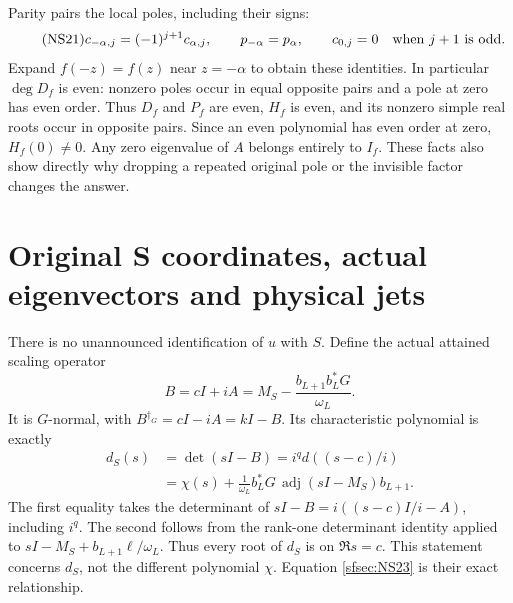 Parity pairs the local poles, including their signs:
\begin{equation}\tag{NS21}\label{sfsec:NS21}
c_{-\alpha,j}=(-1)^{j+1}c_{\alpha,j},\qquad
p_{-\alpha}=p_\alpha,\qquad
c_{0,j}=0\quad\hbox{when }j+1\hbox{ is odd}.
\end{equation}
Expand $f(-z)=f(z)$ near $z=-\alpha$ to obtain these
identities. In particular $\deg D_f$ is even: nonzero
poles occur in equal opposite pairs and a pole at zero
has even order. Thus $D_f$ and $P_f$ are even, $H_f$
is even, and its nonzero simple real roots occur in
opposite pairs. Since an even polynomial has even
order at zero, $H_f(0)\ne0$. Any zero eigenvalue of
$A$ belongs entirely to $I_f$. These facts also show
directly why dropping a repeated original pole or the
invisible factor changes the answer.

\section{Original S coordinates, actual eigenvectors and physical jets}

There is no unannounced identification of $u$ with $S$.
Define the actual attained scaling operator
\begin{equation}\tag{NS22}\label{sfsec:NS22}
B=cI+iA=M_S-\frac{b_{L+1}b_L^*G}{\omega_L}.
\end{equation}
It is $G$-normal, with $B^{\dagger_G}=cI-iA=kI-B$.
Its characteristic polynomial is exactly
\begin{equation}\tag{NS23}\label{sfsec:NS23}
\begin{split}
d_S(s)&=\det(sI-B)=i^qd((s-c)/i)\\
 &=\chi(s)
  +\frac1{\omega_L}b_L^*G\,
               \operatorname{adj}(sI-M_S)b_{L+1}.
\end{split}
\end{equation}
The first equality takes the determinant of
$sI-B=i((s-c)I/i-A)$, including $i^q$.
The second follows from the rank-one determinant identity
applied to $sI-M_S+b_{L+1}\ell/\omega_L$.
Thus every root of $d_S$ is on $\Re s=c$.
This statement concerns $d_S$, not the different polynomial
$\chi$. Equation \eqref{sfsec:NS23} is their exact relationship.

